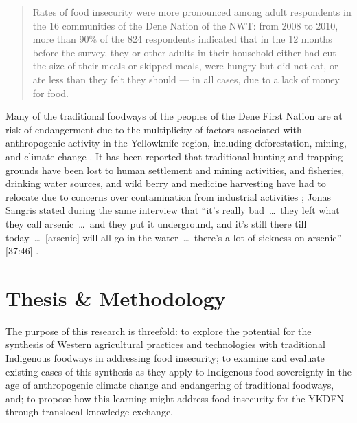 \documentclass{report}
\begin{document}
\begin{quote}
  Rates of food insecurity were more pronounced among adult respondents in the 16 communities of the Dene Nation of the NWT: from 2008 to 2010, more than 90\% of the 824 respondents indicated that in the 12 months before the survey, they or other adults in their household either had cut the size of their meals or skipped meals, were hungry but did not eat, or ate less than they felt they should — in all cases, due to a lack of money for food. \parencite[42]{aboriginalfoodsecurity}
\end{quote}

\hspace{24pt} Many of the traditional foodways of the peoples of the Dene First Nation are at risk of endangerment due to the multiplicity of factors associated with anthropogenic activity in the Yellowknife region, including deforestation, mining, and climate change \parencite{denefoodwaysontologies}.
It has been reported that traditional hunting and trapping grounds have been lost to human settlement and mining activities, and fisheries, drinking water sources, and wild berry and medicine harvesting have had to relocate due to concerns over contamination from industrial activities \parencite{riskperceptions};
Jonas Sangris stated during the same interview that ``it's really bad~\ldots~they left what they call arsenic~\ldots~and they put it underground, and it's still there till today~\ldots~[arsenic] will all go in the water~\ldots~there's a lot of sickness on arsenic'' [37:46] \parencite{jonassangris}.

\section{Thesis \& Methodology}

\hspace{24pt} The purpose of this research is threefold:
to explore the potential for the synthesis of Western agricultural practices and technologies with traditional Indigenous foodways in addressing food insecurity;
to examine and evaluate existing cases of this synthesis as they apply to Indigenous food sovereignty in the age of anthropogenic climate change and endangering of traditional foodways, and;
to propose how this learning might address food insecurity for the YKDFN through translocal knowledge exchange.
\end{document}
